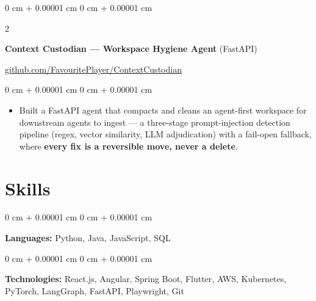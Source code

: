 \documentclass[10pt, letterpaper]{article}
\newenvironment{highlights}{
    \begin{itemize}[
        topsep=0.3 cm,
        parsep=0.075 cm,
        partopsep=0pt,
        itemsep=0.035 cm,
        leftmargin=0 cm + 10pt
    ]
}{
    \end{itemize}
} %
\newenvironment{onecolentry}{
    \begin{adjustwidth}{
        0 cm + 0.00001 cm
    }{
        0 cm + 0.00001 cm
    }
}{
    \end{adjustwidth}
} %
\newenvironment{extendedtwocolentry}[2][]{
    \onecolentry
    \def\secondColumn{#2}
    \setcolumnwidth{\fill, 8 cm}
    \begin{paracol}{2}
}{
    \switchcolumn \raggedleft \secondColumn
    \end{paracol}
    \endonecolentry
}
\begin{document}
        \begin{extendedtwocolentry}{
            \href{https://github.com/FavouritePlayer/ContextCustodian}{github.com/FavouritePlayer/ContextCustodian}
        }
            \textbf{Context Custodian — Workspace Hygiene Agent} (FastAPI)
        \end{extendedtwocolentry}

        \vspace{0.19 cm}
        \begin{onecolentry}
            \begin{highlights}
                \item Built a FastAPI agent that compacts and cleans an agent-first workspace for downstream agents to ingest — a three-stage prompt-injection detection pipeline (regex, vector similarity, LLM adjudication) with a fail-open fallback, where \textbf{every fix is a reversible move, never a delete}.
            \end{highlights}
        \end{onecolentry}

    \section{Skills}

        \begin{onecolentry}
            \textbf{Languages:} Python, Java, JavaScript, SQL
        \end{onecolentry}

        \vspace{0.19 cm}

        \begin{onecolentry}
            \textbf{Technologies:} React.js, Angular, Spring Boot, Flutter, AWS, Kubernetes, PyTorch, LangGraph, FastAPI, Playwright, Git
        \end{onecolentry}
\end{document}
